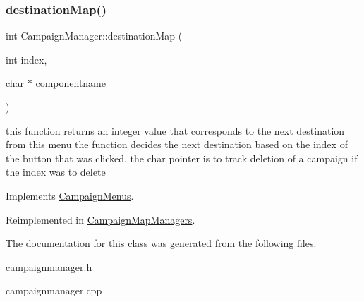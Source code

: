 \subsubsection{\texorpdfstring{destination\+Map()}{destinationMap()}}
{\footnotesize\ttfamily int Campaign\+Manager\+::destination\+Map (\begin{DoxyParamCaption}\item[{int}]{index,  }\item[{char $\ast$}]{componentname }\end{DoxyParamCaption})\hspace{0.3cm}{\ttfamily [virtual]}}

this function returns an integer value that corresponds to the next destination from this menu the function decides the next destination based on the index of the button that was clicked. the char pointer is to track deletion of a campaign if the index was to delete 

Implements \hyperlink{class_campaign_menus}{Campaign\+Menus}.



Reimplemented in \hyperlink{class_campaign_map_managers_a7136317d7a94280b0a0b2a3f69b18182}{Campaign\+Map\+Managers}.



The documentation for this class was generated from the following files\+:\begin{DoxyCompactItemize}
\item 
\hyperlink{campaignmanager_8h}{campaignmanager.\+h}\item 
campaignmanager.\+cpp\end{DoxyCompactItemize}
